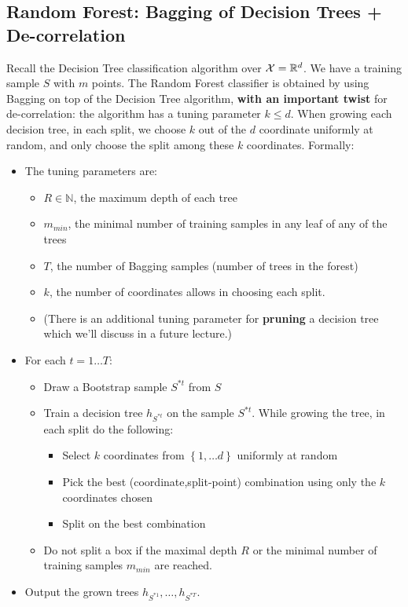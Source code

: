 \subsection{Random Forest: Bagging of Decision Trees + De-correlation}

Recall the Decision Tree classification algorithm over $\mathcal{X}=\mathbb{R}^d$. We have a
training sample $S$ with $m$ points. 
The Random Forest classifier is obtained by using Bagging on top of 
the Decision Tree algorithm, {\bf with an important
twist} for de-correlation: the algorithm has a tuning parameter $k\leq d$. When
growing each decision tree, in each split, we choose $k$ out of the $d$
coordinate uniformly at random, and only choose the split among these $k$
coordinates. Formally:

\begin{itemize}
  \item The tuning parameters are:
    
    \begin{itemize}
      \item $R\in \mathbb{N}$, the maximum depth of each
    tree
  \item  $m_{min}$, the minimal number of training samples in any leaf of any
    of the trees
  \item $T$, the number of Bagging samples (number of trees in the
    forest)
  \item $k$, the number of coordinates allows in choosing each split.
  \item  (There is an additional tuning parameter for {\bf pruning} a decision tree
    which we'll discuss in a future lecture.) 
    \end{itemize}
  \item For each $t=1\ldots T$:
    \begin{itemize}
      \item Draw a Bootstrap sample $S^{*t}$ from $S$
      \item Train a decision tree $h_{S^{*t}}$ on the sample  $S^{*t}$. While
        growing the tree, in each
        split do the following:
        \begin{itemize}
          \item Select $k$ coordinates from $\left\{ 1,\ldots d \right\}$
            uniformly at random
          \item Pick the best (coordinate,split-point) combination using only
            the $k$ coordinates chosen
          \item Split on the best combination 
        \end{itemize}
      \item Do not split a box if the maximal depth $R$ or the minimal number of
        training samples $m_{min}$ are reached.
    \end{itemize}
  \item Output the grown trees $h_{S^{*1}},\ldots ,h_{S^{*T}}$.
   \end{itemize}

